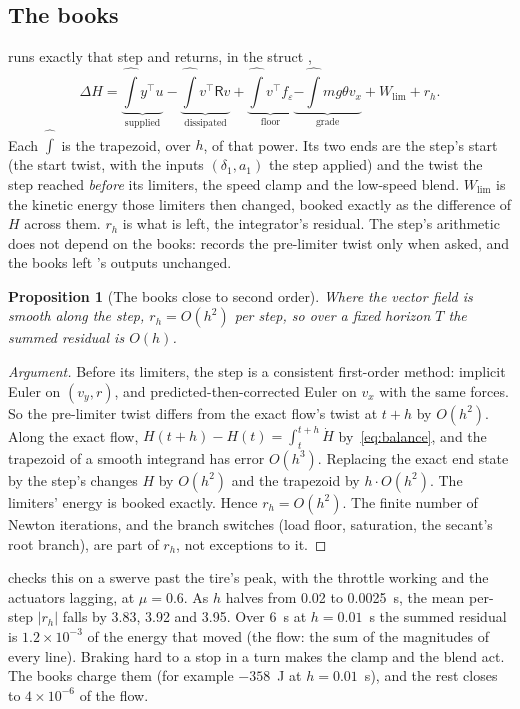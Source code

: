 \documentclass[11pt]{article}
\newtheorem{proposition}{Proposition}
\theoremstyle{remark}
\newcommand{\R}{\mathsf R}
\newcommand{\T}{^{\top}}
\begin{document}
\subsection{The books}
 runs exactly that step and returns, in the struct ,
\begin{equation}
  \Delta H=\underbrace{\widehat{\textstyle\int}y\T u}_{\text{supplied}}
  -\underbrace{\widehat{\textstyle\int}v\T\R v}_{\text{dissipated}}
  +\underbrace{\widehat{\textstyle\int}v\T f_\varepsilon}_{\text{floor}}
  \underbrace{-\widehat{\textstyle\int}mg\theta v_x}_{\text{grade}}
  +W_{\mathrm{lim}}+r_h .
  \label{eq:books}
\end{equation}
Each $\widehat\int$ is the trapezoid, over $h$, of that power. Its two ends are the step's start
(the start twist, with the inputs $(\delta_1,a_1)$ the step applied) and the twist the step reached
\emph{before} its limiters, the speed clamp and the low-speed blend. $W_{\mathrm{lim}}$ is the
kinetic energy those limiters then changed, booked exactly as the difference of $H$ across them.
$r_h$ is what is left, the integrator's residual. The step's arithmetic does not depend on the
books:  records the pre-limiter twist only when asked, and the books left
's outputs unchanged.

\begin{proposition}[The books close to second order]
\label{prop:books}
Where the vector field is smooth along the step, $r_h=O(h^2)$ per step, so over a fixed horizon
$T$ the summed residual is $O(h)$.
\end{proposition}

\begin{proof}[Argument]
Before its limiters, the step is a consistent first-order method: implicit Euler on $(v_y,r)$,
and predicted-then-corrected Euler on $v_x$ with the same forces. So the pre-limiter twist differs
from the exact flow's twist at $t+h$ by $O(h^2)$. Along the exact flow,
$H(t+h)-H(t)=\int_t^{t+h}\dot H$ by~\eqref{eq:balance}, and the trapezoid of a smooth integrand
has error $O(h^3)$. Replacing the exact end state by the step's changes $H$ by $O(h^2)$ and the
trapezoid by $h\cdot O(h^2)$. The limiters' energy is booked exactly. Hence $r_h=O(h^2)$. The
finite number of Newton iterations, and the branch switches (load floor, saturation, the secant's
root branch), are part of $r_h$, not exceptions to it.
\end{proof}

 checks this on a swerve past the tire's peak, with the
throttle working and the actuators lagging, at $\mu=0.6$. As $h$ halves from 0.02 to 0.0025~s,
the mean per-step $\lvert r_h\rvert$ falls by 3.83, 3.92 and 3.95. Over 6~s at $h=0.01$~s the
summed residual is $1.2\times10^{-3}$ of the energy that moved (the flow: the sum of the magnitudes
of every line). Braking hard to a stop in a turn makes the clamp and the blend act. The books charge
them (for example $-358$~J at $h=0.01$~s), and the rest closes to $4\times10^{-6}$ of the flow.
\end{document}

